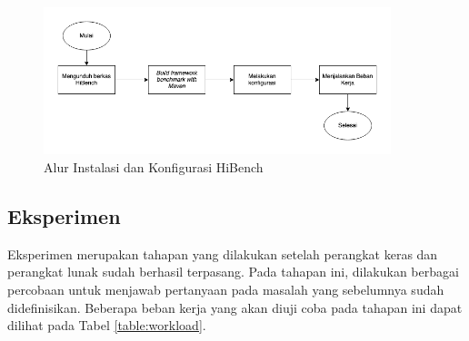 \begin{figure}[h]
    \centering
    \includegraphics[width=0.9\textwidth]{figures/ch03/hibench-flow.png}
    \caption{Alur Instalasi dan Konfigurasi HiBench}
    \label{fig:hibench-flow}
\end{figure}

\subsection{Eksperimen}
Eksperimen merupakan tahapan yang dilakukan setelah perangkat keras dan perangkat lunak sudah berhasil terpasang. Pada tahapan ini, dilakukan berbagai percobaan untuk menjawab pertanyaan pada masalah yang sebelumnya sudah didefinisikan. Beberapa beban kerja yang akan diuji coba pada tahapan ini dapat dilihat pada Tabel \ref{table:workload}. 

\begin{table}[h!]
\caption{Beban Kerja yang Digunakan}
\label{table:workload}
\end{table}

